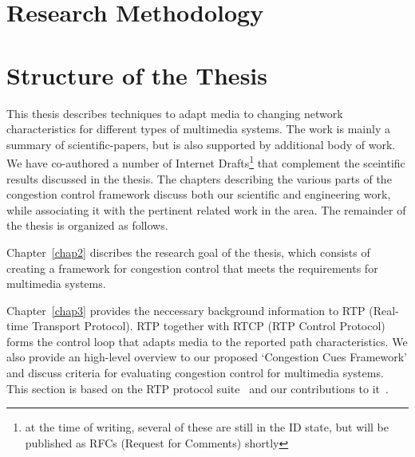 

\section{Research Methodology}

\section{Structure of the Thesis}

This thesis describes techniques to adapt media to changing network
characteristics for different types of multimedia systems. The work is mainly
a summary of scientific-papers, but is also supported by additional body of
work. We have co-authored a number of Internet Drafts\footnote{at the time of
writing, several of these are still in the ID state, but will be published as
RFCs (Request for Comments) shortly} that complement the  sceintific results
discussed in the thesis. The chapters describing the various parts of the
congestion control framework discuss both our scientific and engineering work,
while associating it with the pertinent related work in the area. The
remainder of the thesis is organized as follows.

Chapter~\ref{chap2} discribes the research goal of the thesis, which consists
of creating a framework for congestion control that meets the requirements for
multimedia systems.


Chapter~\ref{chap3} provides the neccessary background information to RTP
(Real-time Transport Protocol). RTP together with RTCP (RTP Control Protocol)
forms the control loop that adapts media to the reported path characteristics.
We also provide an high-level overview to our proposed `Congestion Cues
Framework' and discuss criteria for evaluating congestion control for
multimedia systems. This section is based on the RTP protocol
suite~\cite{rfc3550, rfc4585, rfc3611, rfc5104, rfc5506} and our contributions
to it~\cite{draft.rmcat.evaluate}.


